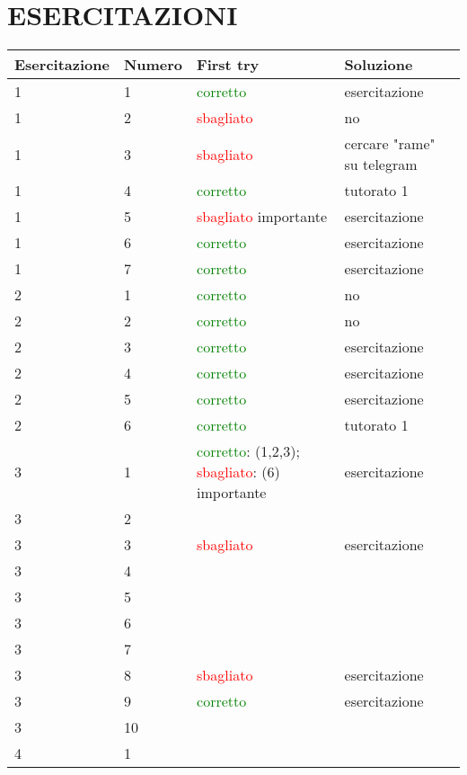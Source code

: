 \documentclass[a4paper, 9pt]{article}
\begin{document}
    \section{ESERCITAZIONI}
    \begin{tabular}{llll}
        \textbf{Esercitazione} & \textbf{Numero} & \textbf{First try} & \textbf{Soluzione}\\
        \hline
        1 & 1 & \textcolor{green}{corretto} & esercitazione\\
        1 & 2 & \textcolor{red}{sbagliato} & no\\
        1 & 3 & \textcolor{red}{sbagliato} & cercare "rame" su telegram\\
        1 & 4 & \textcolor{green}{corretto} & tutorato 1\\
        1 & 5 & \textcolor{red}{sbagliato} importante & esercitazione\\
        1 & 6 & \textcolor{green}{corretto} & esercitazione\\
        1 & 7 & \textcolor{green}{corretto} & esercitazione\\
        \hline
        2 & 1 & \textcolor{green}{corretto} & no\\
        2 & 2 & \textcolor{green}{corretto} & no\\
        2 & 3 & \textcolor{green}{corretto} & esercitazione\\
        2 & 4 & \textcolor{green}{corretto} & esercitazione\\ 
        2 & 5 & \textcolor{green}{corretto} & esercitazione\\
        2 & 6 & \textcolor{green}{corretto} & tutorato 1\\
        \hline
        3 & 1 & \textcolor{green}{corretto}: (1,2,3); \textcolor{red}{sbagliato}: (6) importante & esercitazione\\
        3 & 2 & & \\
        3 & 3 & \textcolor{red}{sbagliato} & esercitazione\\
        3 & 4 & & \\
        3 & 5 & & \\
        3 & 6 & & \\
        3 & 7 & & \\
        3 & 8 & \textcolor{red}{sbagliato} & esercitazione\\
        3 & 9 & \textcolor{green}{corretto} & esercitazione\\
        3 & 10 & & \\
        \hline
        4 & 1 & & \\

\end{tabular}
\end{document}
